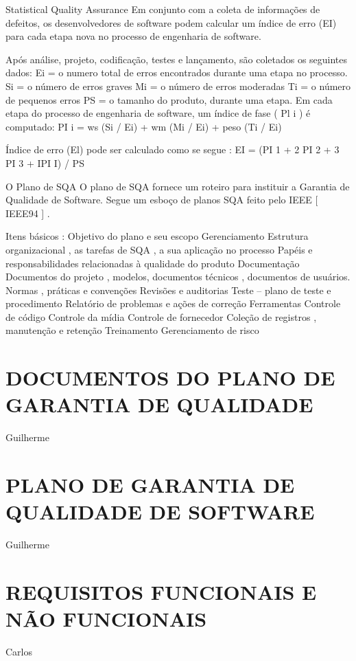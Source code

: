 \documentclass[12pt]{article}
\begin{document}
        Statistical Quality Assurance 
            Em conjunto com a coleta de informações de defeitos, os desenvolvedores de software podem calcular um índice de erro (EI) para cada etapa nova no processo de engenharia de software. 

        Após análise, projeto, codificação, testes e lançamento, são coletados os seguintes dados: 
        Ei = o numero total de erros encontrados durante uma etapa no processo. 
        Si = o número de erros graves 
        Mi = o número de erros moderadas 
        Ti = o número de pequenos erros 
        PS = o tamanho do produto, durante uma etapa. 
        Em cada etapa do processo de engenharia de software, um índice de fase ( Pl i ) é computado: 
        PI i = ws (Si / Ei) + wm (Mi / Ei) + peso (Ti / Ei) 

        Índice de erro (El) pode ser calculado como se segue : 
        EI = (PI 1 + 2 PI 2 + 3 PI 3 + IPI I) / PS 

        O Plano de SQA 
        O plano de SQA fornece um roteiro para instituir a Garantia de Qualidade de Software. 
        Segue um esboço de planos SQA feito pelo IEEE [ IEEE94 ] . 

        Itens básicos : 
            Objetivo do plano e seu escopo 
            Gerenciamento 
            Estrutura organizacional , as tarefas de SQA , a sua aplicação no processo 
            Papéis e responsabilidades relacionadas à qualidade do produto 
            Documentação 
            Documentos do projeto , modelos, documentos técnicos , documentos de usuários. 
            Normas , práticas e convenções 
            Revisões e auditorias 
            Teste – plano de teste e procedimento 
            Relatório de problemas e ações de correção 
            Ferramentas 
            Controle de código 
            Controle da mídia 
            Controle de fornecedor 
            Coleção de registros , manutenção e retenção 
            Treinamento 
            Gerenciamento de risco 

    \section{DOCUMENTOS DO PLANO DE GARANTIA DE QUALIDADE}
        Guilherme
    \section{PLANO DE GARANTIA DE QUALIDADE DE SOFTWARE}
        Guilherme
    \section{REQUISITOS FUNCIONAIS E NÃO FUNCIONAIS}
        Carlos
\end{document}
